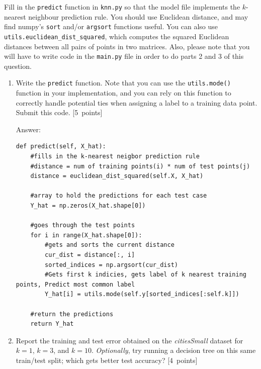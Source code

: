 \documentclass{article}
\newcommand{\blu}[1]{{\textcolor{blu}{#1}}}
\let\ask\blu
\newcommand\pts[1]{\textcolor{pointscolour}{[#1~points]}}
\begin{document}
    Fill in the \texttt{predict} function in \texttt{knn.py} so that the model file implements the $k$-nearest neighbour prediction rule.
    You should use Euclidean distance, and may find numpy's \texttt{sort} and/or \texttt{argsort} functions useful.
    You can also use \texttt{utils.euclidean\string_dist\string_squared}, which computes the squared Euclidean distances between all pairs of points in two matrices. Also, please note that you will have to write code in the \texttt{main.py} file in order to do parts 2 and 3 of this question.
    \begin{enumerate}
        \item Write the \texttt{predict} function. Note that you can use the \texttt{utils.mode()} function in your implementation, and you can rely on this function to correctly handle potential ties when assigning a label to a training data point. \ask{Submit this code.} \pts{5}
        \par\noindent\textcolor{gre}{Answer:}
\begin{lstlisting}
def predict(self, X_hat):
    #fills in the k-nearest neigbor prediction rule
    #distance = num of training points(i) * num of test points(j)
    distance = euclidean_dist_squared(self.X, X_hat)

    #array to hold the predictions for each test case
    Y_hat = np.zeros(X_hat.shape[0])

    #goes through the test points
    for i in range(X_hat.shape[0]):
        #gets and sorts the current distance
        cur_dist = distance[:, i]
        sorted_indices = np.argsort(cur_dist)
        #Gets first k indicies, gets label of k nearest training points, Predict most common label
        Y_hat[i] = utils.mode(self.y[sorted_indices[:self.k]])

    #return the predictions
    return Y_hat 
\end{lstlisting}

        \item \ask{Report the training and test error} obtained on the \emph{citiesSmall} dataset for $k=1$, $k=3$, and $k=10$. \emph{Optionally}, try running a decision tree on this same train/test split; which gets better test accuracy? \pts{4}


\end{enumerate}
\end{document}
